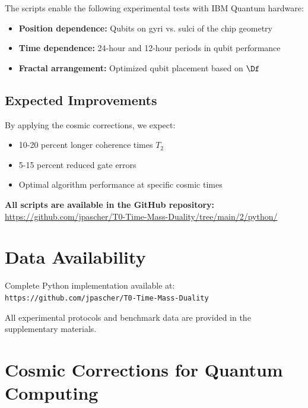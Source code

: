 The scripts enable the following experimental tests with IBM Quantum hardware:

\begin{itemize}
	\item \textbf{Position dependence:} Qubits on gyri vs. sulci of the chip geometry
	\item \textbf{Time dependence:} 24-hour and 12-hour periods in qubit performance
	\item \textbf{Fractal arrangement:} Optimized qubit placement based on $\Df$
\end{itemize}

\subsection{Expected Improvements}

By applying the cosmic corrections, we expect:

\begin{itemize}
	\item 10-20 percent longer coherence times $T_2$
	\item 5-15 percent reduced gate errors
	\item Optimal algorithm performance at specific cosmic times
\end{itemize}

\textbf{All scripts are available in the GitHub repository:} \\
\url{https://github.com/jpascher/T0-Time-Mass-Duality/tree/main/2/python/}

\section*{Data Availability}

Complete Python implementation available at: \\
\texttt{https://github.com/jpascher/T0-Time-Mass-Duality}

All experimental protocols and benchmark data are provided in the supplementary materials.


\section{Cosmic Corrections for Quantum Computing}
\label{sec:cosmic_corrections}

